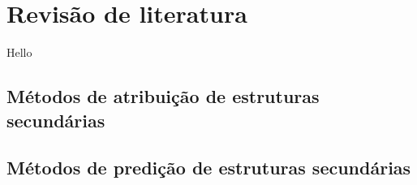 
\chapter{Revisão de literatura}\label{ch:rev_literatura}


Hello \citep{kendrew1958three}

\section{Métodos de atribuição de estruturas secundárias}





\section{Métodos de predição de estruturas secundárias}



